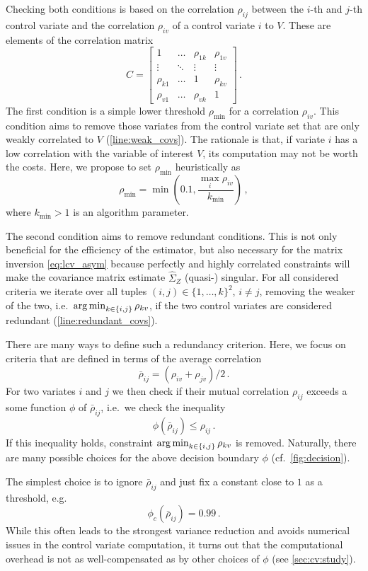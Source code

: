 Checking both conditions is based on the correlation $\rho_{ij}$ between the $i$-th and $j$-th control variate
and the correlation $\rho_{iv}$ of a control variate $i$ to $V$.
These are elements of the correlation matrix
\[
C=
\begin{bmatrix}
1 & \dots & \rho_{1k} & \rho_{1v} \\
\vdots & \ddots & \vdots & \vdots \\
\rho_{k1} & \dots & 1 & \rho_{kv} \\
\rho_{v1} & \dots & \rho_{vk} & 1
\end{bmatrix}\,.
\]
The first condition is a simple lower threshold $\rho_{\min}$ for a correlation $\rho_{iv}$.
This condition aims to remove those variates  from the control  variate set that are only weakly correlated to $V$ (\autoref{line:weak_covs}).
The rationale is that, if variate $i$ has a low correlation with the variable of interest $V$,
its computation may not be worth the costs.
Here, we propose to set $\rho_{\min}$ heuristically as
\[
	\rho_{\min} = \min\left(0.1, \frac{\max_{i}\rho_{iv}}{k_{\min}}\right)\,,
\]
where $k_{\min}>1$ is an algorithm parameter.

The second condition aims to remove redundant conditions.
This is not only beneficial for the efficiency of the estimator, but also 
necessary for the matrix inversion \eqref{eq:lcv_asym}
because perfectly and highly correlated constraints will make
the covariance matrix estimate $\hat{\Sigma}_Z$ (quasi-) singular.
For all considered criteria we iterate over all tuples $(i,j)\in \{1,\dots,k\}^2$, $i\neq j$,
removing the weaker of the two, i.e.\ $\operatorname*{arg\,min}_{k\in\{i,j\}}\rho_{kv}$,
if the two control  variates are considered redundant (\autoref{line:redundant_covs}).

There are many ways to define such a redundancy criterion.
Here, we focus on criteria that are defined in terms of the
average correlation \[ \bar\rho_{ij}=(\rho_{iv} + \rho_{jv})/2\,.\]
For two variates $i$ and $j$ we then check if their mutual correlation
$\rho_{ij}$ exceeds a some function $\phi$ of ${\bar{\rho}}_{ij}$,
i.e.\ we check the inequality
\[
	\phi(\bar\rho_{ij}) \leq \rho_{ij}\,.
\]
If this inequality holds, constraint $\operatorname*{arg\,min}_{k\in\{i,j\}}\rho_{kv}$ is removed.
Naturally, there are many possible choices for the above decision boundary $\phi$ (cf.\ \autoref{fig:decision}).


The simplest choice is to ignore $\bar\rho_{ij}$ and just fix a constant close to $1$ as a threshold,
e.g.\ \[ \phi_c(\bar\rho_{ij})=0.99\,.\] While this often leads to the strongest variance reduction
and avoids numerical issues in the control variate computation, it turns out
that the computational overhead is not as well-com\-pen\-sa\-ted as by other choices of $\phi$ (see \autoref{sec:cv:study}).

